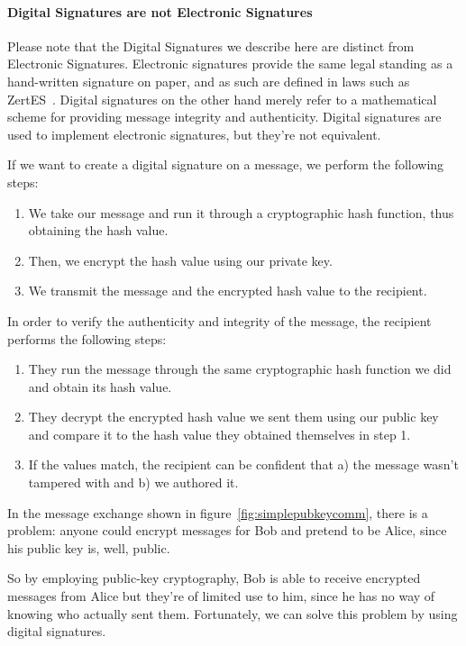 \paragraph{Digital Signatures are not Electronic Signatures}
Please note that the Digital Signatures we describe here are distinct from Electronic Signatures.
Electronic signatures provide the same legal standing as a hand-written signature on paper,
and as such are defined in laws such as ZertES~\cite{zertes}.
Digital signatures on the other hand merely refer to a mathematical scheme for providing message integrity and authenticity.
Digital signatures are used to implement electronic signatures, but they're not equivalent.


If we want to create a digital signature on a message, we perform the following steps:
\begin{enumerate}\label{enum:digitalsignaturecreation}
\item We take our message and run it through a cryptographic hash function, thus obtaining the hash value.
\item Then, we encrypt the hash value using our private key.
\item We transmit the message and the encrypted hash value to the recipient.
\end{enumerate}

In order to verify the authenticity and integrity of the message, the recipient performs the following steps:
\begin{enumerate}
    \item They run the message through the same cryptographic hash function we did and obtain its hash value.
    \item They decrypt the encrypted hash value we sent them using our public key and compare it to the hash value they obtained themselves in step 1.
    \item If the values match, the recipient can be confident that a) the message wasn't tampered with and b) we authored it.
\end{enumerate}

In the message exchange shown in figure~\ref{fig:simplepubkeycomm},
there is a problem: anyone could encrypt messages for Bob and pretend to be Alice, since his public key is, well, public.

So by employing public-key cryptography, Bob is able to receive encrypted messages from Alice but they're of limited use to him,
since he has no way of knowing who actually sent them.
Fortunately, we can solve this problem by using digital signatures.

